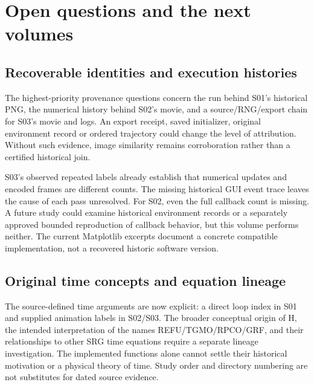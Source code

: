\chapter{Open questions and the next volumes}\label{ch:agenda}

\section{Recoverable identities and execution histories}
The highest-priority provenance questions concern the run behind
S01's historical PNG, the numerical history behind S02's movie,
and a source/RNG/export chain for S03's movie and logs.
An export receipt, saved initializer, original environment record
or ordered trajectory could change the level of attribution.
Without such evidence, image similarity remains corroboration
rather than a certified historical join. 

S03's observed repeated labels already establish that numerical
updates and encoded frames are different counts. The missing
historical GUI event trace leaves the cause of each pass unresolved.
For S02, even the full callback count is missing. A future study
could examine historical environment records or a separately
approved bounded reproduction of callback behavior, but this
volume performs neither. The current Matplotlib excerpts document
a concrete compatible implementation, not a recovered historic
software version. 

\section{Original time concepts and equation lineage}
The source-defined time arguments are now explicit: a direct loop
index in S01 and supplied animation labels in S02/S03.
The broader conceptual origin of H, the intended interpretation
of the names REFU/TGMO/RPCO/GRF, and their relationships to other
SRG time equations require a separate lineage investigation.
The implemented functions alone cannot settle their historical
motivation or a physical theory of time. Study order and directory
numbering are not substitutes for dated source evidence.

